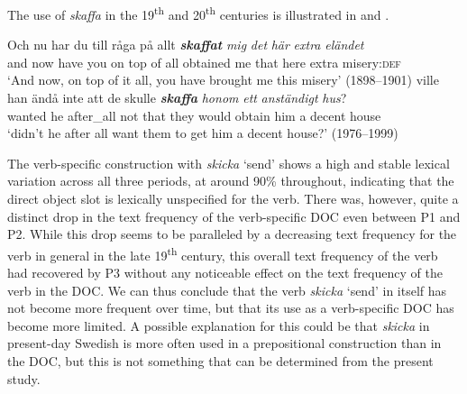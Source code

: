 \documentclass[output=paper]{langscibook}
\begin{document}
\begin{table}
\caption{Frequency measures of the verb-specific DOC with \textit{skaffa} ‘obtain’}
\label{tab:valdeson:18}
\end{table}

The use of \textit{skaffa} in the 19\textsuperscript{th} and 20\textsuperscript{th} centuries is illustrated in  and .


\ea \label{ex:valdeson:28}
\gll Och   nu   har   du   till     råga   på   allt \textbf{\textit{skaffat}} \textit{mig} \textit{det}     \textit{här}   \textit{extra} \textit{eländet}\\
  and     now have   you on   top   of       all   obtained   me  that    here    extra   misery:\textsc{def}\\
\glt `And now, on top of it all, you have brought me this misery’ (1898–1901)
\ex \label{ex:valdeson:29}
\gll ville     han ändå     inte    att    de   skulle \textbf{\textit{skaffa}} \textit{honom} \textit{ett}   \textit{anständigt}   \textit{hus}?\\
  wanted   he   after\_all not     that   they   would   obtain   him a   decent           house\\
\glt `didn’t he after all want them to get him a decent house?’ (1976–1999)
\z


\label{sec:valdeson:5.3.3.6}\largerpage[2]
The verb-specific construction with \textit{skicka} ‘send’ shows a high and stable lexical variation across all three periods, at around 90\% throughout, indicating that the direct object slot is lexically unspecified for the verb. There was, however, quite a distinct drop in the text frequency of the verb-specific DOC even between P1 and P2. While this drop seems to be paralleled by a decreasing text frequency for the verb in general in the late 19\textsuperscript{th} century, this overall text frequency of the verb had recovered by P3 without any noticeable effect on the text frequency of the verb in the DOC. We can thus conclude that the verb \textit{skicka} ‘send’ in itself has not become more frequent over time, but that its use as a verb-specific DOC has become more limited. A possible explanation for this could be that \textit{skicka} in present-day Swedish is more often used in a prepositional construction than in the DOC, but this is not something that can be determined from the present study.
\end{document}
